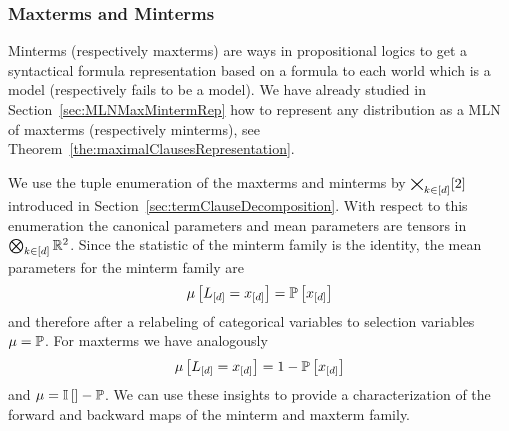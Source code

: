 \subsubsection{Maxterms and Minterms}

Minterms (respectively maxterms) are ways in propositional logics to get a syntactical formula representation based on a formula to each world which is a model (respectively fails to be a model).
We have already studied in Section~\ref{sec:MLNMaxMintermRep} how to represent any distribution as a MLN of maxterms (respectively minterms), see Theorem~\ref{the:maximalClausesRepresentation}.

We use the tuple enumeration of the maxterms and minterms by $\bigtimes_{k\in[d]}[2]$ introduced in Section~\ref{sec:termClauseDecomposition}.
With respect to this enumeration the canonical parameters and mean parameters are tensors in $\bigotimes_{k\in[d]}\mathbb{R}^2$. 
Since the statistic of the minterm family is the identity, the mean parameters for the minterm family are
	\[ \mu\left[L_{[d]}=x_{[d]}\right] 
	= \mathbb{P}\left[x_{[d]}\right] 
	\]
and therefore after a relabeling of categorical variables to selection variables $\mu=\mathbb{P}$.
For maxterms we have analogously
	\[ \mu\left[L_{[d]}=x_{[d]}\right] 
	= 1-\mathbb{P}\left[x_{[d]}\right] 
	\]
and $\mu = \mathbb{I}\left[\right]-\mathbb{P}$.
We can use these insights to provide a characterization of the forward and backward maps of the minterm and maxterm family.

